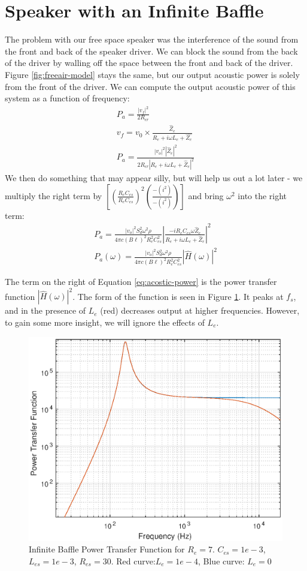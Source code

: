 \documentclass[10pt]{book}
\begin{document}
\section{Speaker with an Infinite Baffle}
The problem with our free space speaker was the interference of the sound from the front and back of the speaker driver. We can block the sound from the back of the driver by walling off the space between the front and back of the driver. Figure \ref{fig:freeair-model} stays the same, but our output acoustic power is solely from the front of the driver. We can compute the output acoustic power of this system as a function of frequency:
\begin{align}
P_a=\frac{\left| v_f \right|^2}{2R_{er}}\\
v_f=v_0\times\frac{\hat{Z}_e}{R_e+i\omega L_e+\hat{Z_e}}\\
P_a=\frac{\left| v_o \right|^2 \left| \hat{Z}_e \right|^2 }{2R_{er}\left| R_e+i\omega L_e+\hat{Z}_e\right|^2}
\end{align}
We then do something that may appear silly, but will help us out a lot later - we multiply the right term by $\left[ \left(\frac{R_{e} C_{es}}{R_{e}C_{es}}\right)^2\left( \frac{-(i^2)}{-(i^2)} \right) \right] $ and bring $\omega^2$ into the right term:
\begin{align}
P_a=\frac{\left| v_o \right|^2S_d^2\omega^2 \rho}{
4\pi c (B\ell)^2 R_{e}^2 C_{es}^2
}\left| \frac{ -i R_{e} C_{es} \omega \hat{Z}_e }{ R_e+i\omega L_e+\hat{Z}_e} \right|^2\\
P_a(\omega)=\frac{\left| v_o \right|^2S_d^2\omega^2 \rho}{
4\pi c (B\ell)^2 R_{e}^2 C_{es}^2
}\left| \hat{H}(\omega) \right|^2 \label{eq:acostic-power}
\end{align}

The term on the right of Equation \ref{eq:acostic-power} is the power transfer function $\left| \hat{H}(\omega)\right|^2$. The form of the function is seen in Figure \ref{fig:power-transfer}. It peaks at $f_s$, and in the presence of $L_e$ (red) decreases output at higher frequencies. However, to gain some more insight, we will ignore the effects of $L_e$.

\begin{figure}
\centering
\includegraphics[width=.75\textwidth]{matlab/infiniteBafflePower.eps}
\caption{Infinite Baffle Power Transfer Function for $R_e=7$.
$C_{es}=1e-3$, $L_{es}=1e-3$, $R_{es}=30$. Red curve:$L_e=1e-4$, Blue curve: $L_e=0$}\label{fig:power-transfer}
\end{figure}
\end{document}
